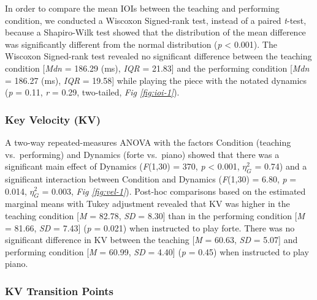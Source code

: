 \documentclass[
  english,
  man,floatsintext]{apa6}
\begin{document}
In order to compare the mean IOIs between the teaching and performing condition, we conducted a Wiscoxon Signed-rank test, instead of a paired \emph{t}-test, because a Shapiro-Wilk test showed that the distribution of the mean difference was significantly different from the normal distribution (\emph{p} \textless{} 0.001). The Wiscoxon Signed-rank test revealed no significant difference between the teaching condition {[}\emph{Mdn} = 186.29 (ms), \emph{IQR} = 21.83{]} and the performing condition {[}\emph{Mdn} = 186.27 (ms), \emph{IQR} = 19.58{]} while playing the piece with the notated dynamics (\emph{p} = 0.11, \emph{r} = 0.29, two-tailed, \emph{Fig \ref{fig:ioi-1}}).

\hypertarget{key-velocity-kv-1}{%
\subsubsection{Key Velocity (KV)}\label{key-velocity-kv-1}}

A two-way repeated-measures ANOVA with the factors Condition (teaching vs.~performing) and Dynamics (forte vs.~piano) showed that there was a significant main effect of Dynamics (\emph{F}(1,30) = 370, \emph{p} \textless{} 0.001, \(\eta_G^2\) = 0.74) and a significant interaction between Condition and Dynamics (\emph{F}(1,30) = 6.80, \emph{p} = 0.014, \(\eta_G^2\) = 0.003, \emph{Fig \ref{fig:vel-1}}). Post-hoc comparisons based on the estimated marginal means with Tukey adjustment revealed that KV was higher in the teaching condition {[}\emph{M} = 82.78, \emph{SD} = 8.30{]} than in the performing condition {[}\emph{M} = 81.66, \emph{SD} = 7.43{]} (\emph{p} = 0.021) when instructed to play forte. There was no significant difference in KV between the teaching {[}\emph{M} = 60.63, \emph{SD} = 5.07{]} and performing condition {[}\emph{M} = 60.99, \emph{SD} = 4.40{]} (\emph{p} = 0.45) when instructed to play piano.

\hypertarget{kv-transition-points}{%
\subsubsection{KV Transition Points}\label{kv-transition-points}}
\end{document}
